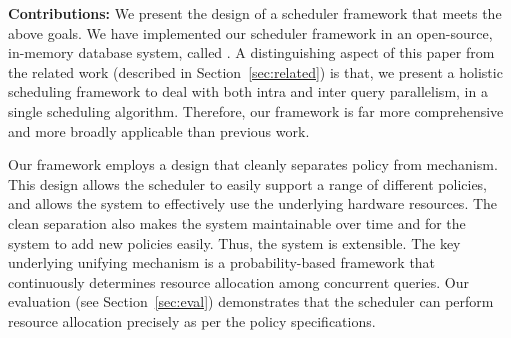 %
\textbf{Contributions:} We present the design of a scheduler framework that meets the above goals. 
We have implemented our scheduler framework in an open-source, in-memory database system, called \sys{}.
A distinguishing aspect of this paper from the related work (described in Section~\ref{sec:related}) is that, we present a holistic scheduling framework to deal with both intra and inter query parallelism, in a single scheduling algorithm. 
Therefore, our framework is far more comprehensive and more broadly applicable than previous work.

Our framework employs a design that cleanly separates policy from mechanism. 
This design allows the scheduler to easily support a range of  different policies, and allows the system to effectively use the underlying hardware resources. 
The clean separation also makes the system maintainable over time and for the system to add new policies easily. Thus, the system is extensible. 
The key underlying unifying mechanism is a probability-based framework that continuously determines resource allocation among concurrent queries.
Our evaluation (see Section~\ref{sec:eval}) demonstrates that the scheduler can perform resource allocation precisely as per the policy specifications. 

